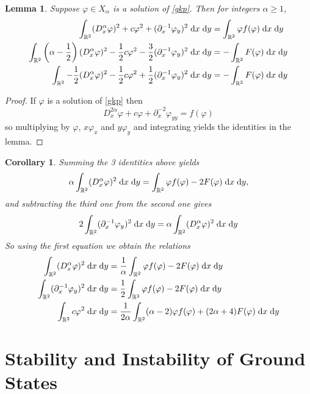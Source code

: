 \documentclass[10pt]{article}
\numberwithin{equation}{section}
\newtheorem{lemma}[theorem]{\quad Lemma}
\newtheorem{corollary}[theorem]{\quad Corollary}
\newcommand{\dd}{\;{\rm d}}
\newcommand{\ff}{\varphi}
\newcommand{\al}{\alpha}
\begin{document}
	\begin{lemma}\label{Pohozaev} Suppose $\ff\in X_\al$ is a solution of \eqref{gkp}. Then for integers $\alpha\geq1$,
		\begin{align*}
			\int_{\mathbb R^2}(D_x^\alpha\ff)^2+c\ff^2+(\partial_x^{-1}\ff_y)^2\dd x\dd y&=\int_{\mathbb R^2}\ff f(\ff)\dd x\dd y\\
			\int_{\mathbb R^2}\left(\alpha-\frac12\right)(D_x^\alpha\ff)^2-\frac12c\ff^2-\frac32(\partial_x^{-1}\ff_y)^2\dd x\dd y&=-\int_{\mathbb R^2}F(\ff)\dd x\dd y\\
			\int_{\mathbb R^2}-\frac12(D_x^\alpha\ff)^2-\frac12c\ff^2+\frac12(\partial_x^{-1}\ff_y)^2\dd x\dd y&=-\int_{\mathbb R^2}F(\ff)\dd x\dd y
		\end{align*}
	\end{lemma}
	\vskip 10pt
	\begin{proof} If $\ff$ is a solution of \eqref{gkp} then 
		\[
		D_x^{2\alpha}\ff+c\ff+\partial_x^{-2}\ff_{yy}=f(\ff)
		\]
		so multiplying by $\ff$, $x\ff_x$ and $y\ff_y$ and integrating yields the identities in the lemma.
	\end{proof}
 
	\begin{corollary}\label{poho-c}
		Summing the 3 identities above yields
	\[
	\alpha\int_{\mathbb R^2}(D_x^\alpha\ff)^2\dd x\dd y=\int_{\mathbb R^2}\ff f(\ff)-2F(\ff)\dd x\dd y,
	\]
	and subtracting the third one from the second one gives
	\[
	2\int_{\mathbb R^2}(\partial_x^{-1}\ff_y)^2\dd x\dd y=\alpha\int_{\mathbb R^2}(D_x^\alpha\ff)^2\dd x\dd y
	\]
	So using the first equation we obtain the relations
	\begin{align*}
		\int_{\mathbb R^2}(D_x^\alpha\ff)^2\dd x\dd y&=\frac1{\alpha}\int_{\mathbb R^2}\ff f(\ff)-2F(\ff)\dd x\dd y\\
		\int_{\mathbb R^2}(\partial_x^{-1}\ff_y)^2\dd x\dd y&=\frac1{2}\int_{\mathbb R^2}\ff f(\ff)-2F(\ff)\dd x\dd y\\
		\int_{\mathbb R^2}c\ff^2\dd x\dd y&=\frac1{2\alpha}\int_{\mathbb R^2}(\alpha-2)\ff f(\ff)+(2\alpha+4)F(\ff)\dd x\dd y
	\end{align*}
	\end{corollary}
	
	\section{Stability and Instability of Ground States}\label{sect-stability}
	
\end{document}
